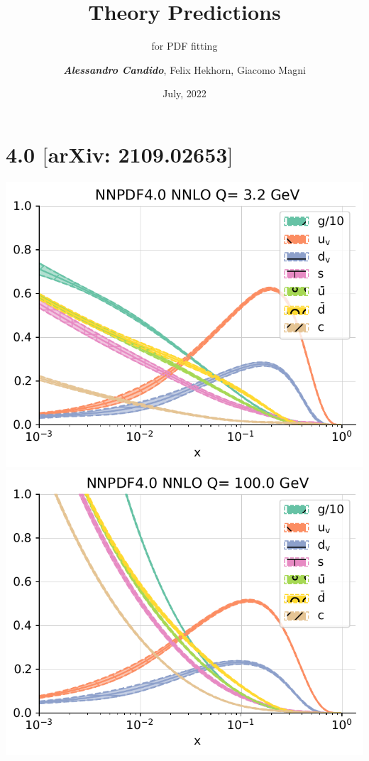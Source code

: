 \documentclass[9pt]{beamer}
\title{Theory Predictions}
\subtitle{for PDF fitting}
\date{July, 2022}
\author{\textit{\textbf{Alessandro Candido}}, Felix Hekhorn, Giacomo Magni}
\providecommand{\iRef}[1]{{\color{mLightGreen}\small $[$#1$]$}}
\begin{document}
\maketitle


\section{\nnpdf{} 4.0 \iRef{arXiv: 2109.02653}}

\begin{frame}{}
    \begin{center}
            \includegraphics[width=.49\linewidth]{pdfs_pdg_Qs0_plot_flavours}
            \includegraphics[width=.49\linewidth]{pdfs_pdg_Qs1_plot_flavours}
    \end{center}
\end{frame}
\end{document}
